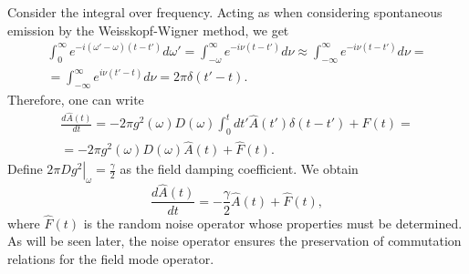 Consider the integral over frequency. Acting as when considering spontaneous emission by the Weisskopf-Wigner method, we get
\begin{eqnarray}
\int_0^{\infty}e^{- i\left(\omega' -
  \omega\right)\left(t - t'\right)} d \omega' = 
\int_{-\omega}^{\infty} e^{-i \nu \left(t - t'\right)} d \nu \approx 
\int_{-\infty}^{\infty} e^{-i \nu \left(t - t'\right)} d \nu = 
\nonumber \\
= \int_{-\infty}^{\infty} e^{i \nu \left(t' - t\right)} d \nu = 
2 \pi \delta\left(t' - t\right).
\nonumber
\end{eqnarray}
Therefore, one can write
\begin{eqnarray}
\frac{d \hat{A}\left(t\right)}{d t} = 
- 2 \pi g^2\left(\omega\right) 
D\left(\omega\right)
\int_0^t d t'
  \hat{A}\left(t'\right)
\delta\left(t - t'\right)  + \hat{F}\left(t\right) = 
\nonumber \\
=
- 2 \pi g^2\left(\omega\right) 
D\left(\omega\right) \hat{A}\left(t\right)
 + \hat{F}\left(t\right).
\nonumber
\end{eqnarray}
Define
\(
\left.2 \pi D g^2\right|_{\omega} = \frac{\gamma}{2}
\) as the field damping coefficient. We obtain
\begin{equation}
\frac{d \hat{A}\left(t\right)}{d t} = 
- \frac{\gamma}{2} \hat{A}\left(t\right) + 
\hat{F}\left(t\right),
\label{eqPart1Ch2_LanzgevenAeq}
\end{equation}
where $\hat{F}\left(t\right)$ is the random noise operator whose properties must be determined. As will be seen later, the noise operator ensures the preservation of commutation relations for the field mode operator.

